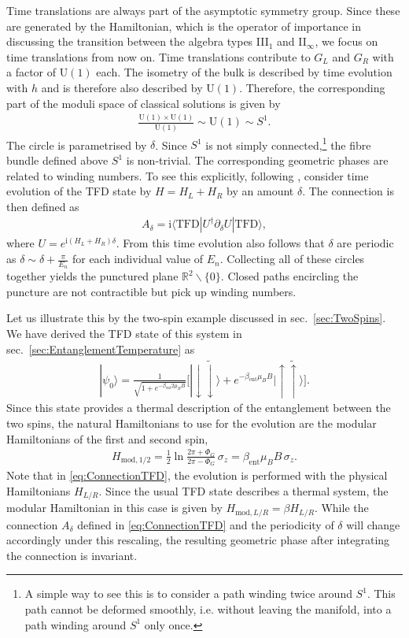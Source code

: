 \documentclass[a4paper,11pt]{article}
\renewcommand{\i}{\text{i}}
\newcommand{\U}{\text{U}}
\newcommand{\1}{\mathds{1}}
\newcommand{\tfd}{\text{TFD}}
\begin{document}
Time translations are always part of the asymptotic symmetry group. Since these are generated by the Hamiltonian, which is the operator of importance in discussing the transition between the algebra types III$_1$ and II$_\infty$, we focus on time translations from now on. Time translations contribute to $G_L$ and $G_R$ with a factor of $\U(1)$ each. The isometry of the bulk is described by time evolution with $h$ and is therefore also described by $\U(1)$. Therefore, the corresponding part of the moduli space of classical solutions is given by
\begin{align}
    \frac{\U(1)\times\U(1)}{\U(1)}\sim\U(1)\sim S^1.\label{eq:ModSpaceTimeTrans}
\end{align}
The circle is parametrised by $\delta$. Since $S^1$ is not simply connected,\footnote{A simple way to see this is to consider a path winding twice around $S^1$. This path cannot be deformed smoothly, i.e. without leaving the manifold, into a path winding around $S^1$ only once.} the fibre bundle defined above $S^1$ is non-trivial. The corresponding geometric phases are related to winding numbers. To see this explicitly, following \cite{Nogueira:2021ngh}, consider time evolution of the TFD state by $H=H_L+H_R$ by an amount $\delta$. The connection is then defined as
\begin{align}
    A_\delta=\i\langle\tfd|U^\dagger\partial_\delta U|\tfd\rangle,\label{eq:ConnectionTFD}
\end{align}
where $U=e^{\i(H_L+H_R)\delta}$. From this time evolution also follows that $\delta$ are periodic as $\delta\sim\delta+\frac{\pi}{E_n}$ for each individual value of $E_n$. Collecting all of these circles together yields the punctured plane $\mathds{R}^2\backslash\{0\}$. Closed paths encircling the puncture are not contractible but pick up winding numbers.

Let us illustrate this by the two-spin example discussed in sec.~\ref{sec:TwoSpins}. We have derived the TFD state of this system in sec.~\ref{sec:EntanglementTemperature} as
\begin{align}
    |\psi_0\rangle=\frac{1}{\sqrt{1+e^{-\beta_{\text{ent}}2\mu_BB}}}\Big[|\!\downarrow\!\tilde{\downarrow}\rangle+e^{-\beta_{\text{ent}}\mu_BB}|\!\uparrow\!\tilde{\uparrow}\rangle\Big].
\end{align}
Since this state provides a thermal description of the entanglement between the two spins, the natural Hamiltonians to use for the evolution are the modular Hamiltonians of the first and second spin,
\begin{align}
    H_{\text{mod},1/2}=\frac{1}{2}\ln\frac{2\pi+\Phi_G}{2\pi-\Phi_G}\,\sigma_z=\beta_{\text{ent}}\mu_BB\,\sigma_z.\label{eq:TwoSpinModHam}
\end{align}
Note that in \eqref{eq:ConnectionTFD}, the evolution is performed with the physical Hamiltonians $H_{L/R}$. Since the usual TFD state describes a thermal system, the modular Hamiltonian in this case is given by $H_{\text{mod},L/R}=\beta H_{L/R}$. While the connection $A_\delta$ defined in \eqref{eq:ConnectionTFD} and the periodicity of $\delta$ will change accordingly under this rescaling, the resulting geometric phase after integrating the connection is invariant.
\end{document}
